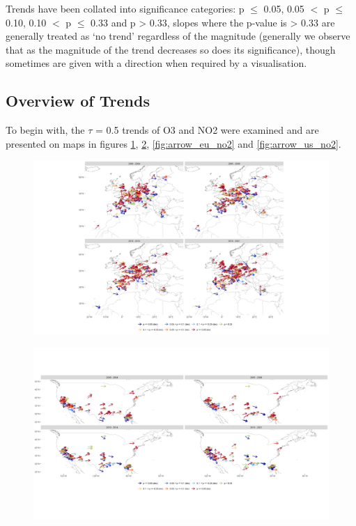 \documentclass[journal abbreviation, manuscript]{copernicus}
\begin{document}
Trends have been collated into significance categories: p $\le$ 0.05, 0.05 $<$ p $\le$ 0.10, 0.10 $<$ p $\le$ 0.33 and p > 0.33, slopes where the p-value is > 0.33 are generally treated as ‘no trend’ regardless of the magnitude (generally we observe that as the magnitude of the trend decreases so does its significance), though sometimes are given with a direction when required by a visualisation.

\subsection{Overview of Trends} \label{sect:overview_of_trends}
To begin with, the $\tau$ = 0.5 trends of O3 and NO2 were examined and are presented on maps in figures \ref{fig:arrow_eu_o3}, \ref{fig:arrow_us_o3}, \ref{fig:arrow_eu_no2} and \ref{fig:arrow_us_no2}.

\begin{figure}[htbp]
\includegraphics[width=12cm]{plots/arrow_maps/o3/11/EU_map_spc_o3_tau_0.5_seg_11_14.png}
\caption{}
\label{fig:arrow_eu_o3}
\end{figure}

\begin{figure}[htbp]
\includegraphics[width=12cm]{plots/arrow_maps/o3/11/US_map_spc_o3_tau_0.5_seg_11_14.png}
\caption{}
\label{fig:arrow_us_o3}
\end{figure}
\end{document}
